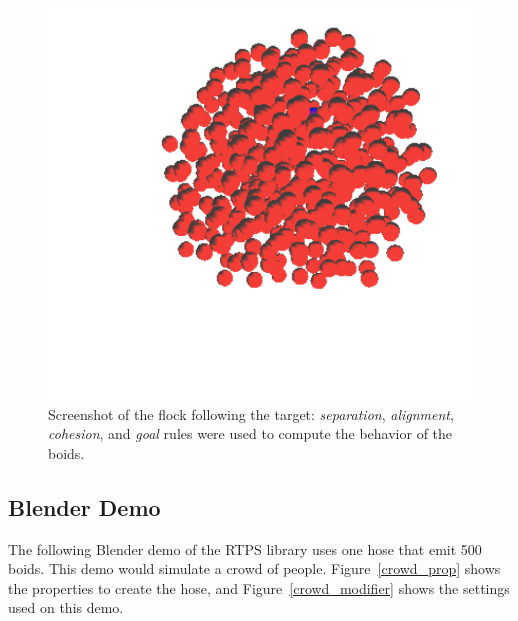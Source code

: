 \begin{figure}[htbp]
\begin{center}
\includegraphics[scale=0.35]{figures/demo_goal_4rules.pdf}
\caption{Screenshot of the flock following the target: \textit{separation}, \textit{alignment}, \textit{cohesion}, and \textit{goal} rules were used to compute the behavior of the boids.}
\label{goal_4rules}
\end{center}
\end{figure}

\subsection{Blender Demo}

The following Blender demo of the RTPS library uses one hose that emit 500 boids. This demo would simulate a crowd of people. Figure~\ref{crowd_prop} shows the properties to create the hose, and Figure~\ref{crowd_modifier} shows the settings used on this demo. 

